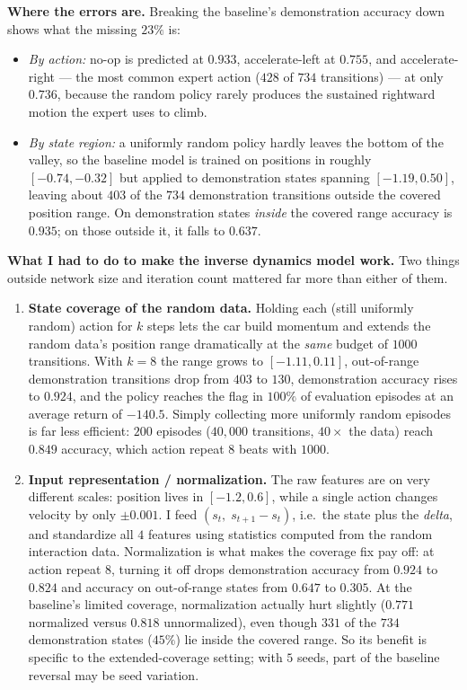 \documentclass[12pt]{article}%
\begin{document}
\medskip
\noindent\textbf{Where the errors are.} Breaking the baseline's demonstration accuracy down
shows what the missing $23\%$ is:
\begin{itemize}
  \item \emph{By action:} no-op is predicted at $0.933$, accelerate-left at $0.755$, and
        accelerate-right --- the most common expert action ($428$ of $734$ transitions) ---
        at only $0.736$, because the random policy rarely produces the sustained rightward
        motion the expert uses to climb.
  \item \emph{By state region:} a uniformly random policy hardly leaves the bottom of the
        valley, so the baseline model is trained on positions in roughly $[-0.74, -0.32]$
        but applied to demonstration states spanning $[-1.19, 0.50]$, leaving about $403$ of
        the $734$ demonstration transitions outside the covered position range. On
        demonstration states \emph{inside} the covered range accuracy is $0.935$; on those
        outside it, it falls to $0.637$.
\end{itemize}

\medskip
\noindent\textbf{What I had to do to make the inverse dynamics model work.} Two things
outside network size and iteration count mattered far more than either of them.

\begin{enumerate}
  \item \textbf{State coverage of the random data.} Holding each (still uniformly random)
        action for $k$ steps lets the car build momentum and extends the random data's
        position range dramatically at the \emph{same} budget of $1000$ transitions. With
        $k=8$ the range grows to $[-1.11, 0.11]$, out-of-range demonstration transitions
        drop from $403$ to $130$, demonstration accuracy rises to $0.924$, and the policy
        reaches the flag in $100\%$ of evaluation episodes at an average return of $-140.5$.
        Simply collecting more uniformly random episodes is far less efficient: $200$
        episodes ($40{,}000$ transitions, $40\times$ the data) reach $0.849$ accuracy, which
        action repeat $8$ beats with $1000$.
  \item \textbf{Input representation / normalization.} The raw features are on very
        different scales: position lives in $[-1.2, 0.6]$, while a single action changes
        velocity by only $\pm 0.001$. I feed $(s_t,\; s_{t+1} - s_t)$, i.e.\ the state plus
        the \emph{delta}, and standardize all $4$ features using statistics computed from
        the random interaction data. Normalization is what makes the coverage fix pay off:
        at action repeat $8$, turning it off drops demonstration accuracy from $0.924$ to
        $0.824$ and accuracy on out-of-range states from $0.647$ to $0.305$. At the
        baseline's limited coverage, normalization actually hurt slightly ($0.771$
        normalized versus $0.818$ unnormalized), even though $331$ of the $734$
        demonstration states ($45\%$) lie inside the covered range. So its benefit is
        specific to the extended-coverage setting; with $5$ seeds, part of the baseline
        reversal may be seed variation.
\end{enumerate}
\end{document}
